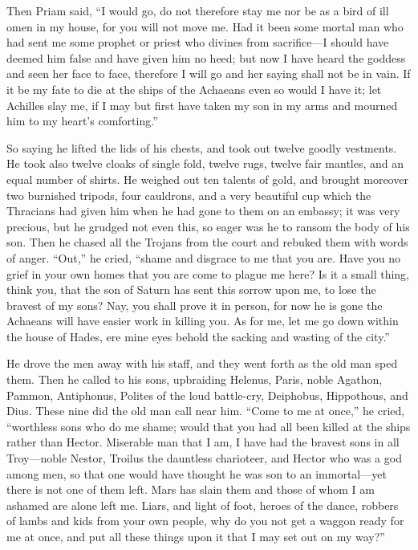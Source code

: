 Then Priam said, “I would go, do not therefore stay me nor be as a bird of
ill omen in my house, for you will not move me. Had it been some mortal
man who had sent me some prophet or priest who divines from sacrifice—I
should have deemed him false and have given him no heed; but now I have
heard the goddess and seen her face to face, therefore I will go and her
saying shall not be in vain. If it be my fate to die at the ships of the
Achaeans even so would I have it; let Achilles slay me, if I may but first
have taken my son in my arms and mourned him to my heart’s comforting.”

So saying he lifted the lids of his chests, and took out twelve goodly
vestments. He took also twelve cloaks of single fold, twelve rugs, twelve
fair mantles, and an equal number of shirts. He weighed out ten talents of
gold, and brought moreover two burnished tripods, four cauldrons, and a
very beautiful cup which the Thracians had given him when he had gone to
them on an embassy; it was very precious, but he grudged not even this, so
eager was he to ransom the body of his son. Then he chased all the Trojans
from the court and rebuked them with words of anger. “Out,” he cried,
“shame and disgrace to me that you are. Have you no grief in your own
homes that you are come to plague me here? Is it a small thing, think you,
that the son of Saturn has sent this sorrow upon me, to lose the bravest
of my sons? Nay, you shall prove it in person, for now he is gone the
Achaeans will have easier work in killing you. As for me, let me go down
within the house of Hades, ere mine eyes behold the sacking and wasting of
the city.”

He drove the men away with his staff, and they went forth as the old man
sped them. Then he called to his sons, upbraiding Helenus, Paris, noble
Agathon, Pammon, Antiphonus, Polites of the loud battle-cry, Deiphobus,
Hippothous, and Dius. These nine did the old man call near him. “Come to
me at once,” he cried, “worthless sons who do me shame; would that you had
all been killed at the ships rather than Hector. Miserable man that I am,
I have had the bravest sons in all Troy—noble Nestor, Troilus the
dauntless charioteer, and Hector who was a god among men, so that one
would have thought he was son to an immortal—yet there is not one of
them left. Mars has slain them and those of whom I am ashamed are alone
left me. Liars, and light of foot, heroes of the dance, robbers of lambs
and kids from your own people, why do you not get a waggon ready for me at
once, and put all these things upon it that I may set out on my way?”

